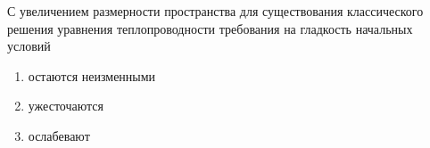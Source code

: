 С увеличением размерности пространства для существования классического решения уравнения теплопроводности требования на гладкость начальных условий

\begin{enumerate}[label=\arabic*)]
    \item остаются неизменными
    \item ужесточаются
    \item ослабевают
\end{enumerate}


